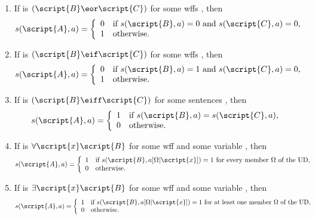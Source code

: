 \begin{enumerate}
\item If  is $(\script{B}\eor\script{C})$ for some wffs , then
\begin{displaymath}s(\script{A}, a) =
	\left\{\begin{array}{ll}
	0 & \mbox{if $s(\script{B}, a) = 0$  and $s(\script{C}, a) = 0$,}\\
	1 & \mbox{otherwise.}
	\end{array}\right.
\end{displaymath}

\item If  is $(\script{B}\eif\script{C})$ for some wffs , then
\begin{displaymath}s(\script{A}, a) =
	\left\{\begin{array}{ll}
	0 & \mbox{if $s(\script{B}, a) = 1$ and $s(\script{C}, a) = 0$,}\\
	1 & \mbox{otherwise.}
	\end{array}\right.
\end{displaymath}

\item If  is $(\script{B}\eiff\script{C})$ for some sentences , then
\begin{displaymath}s(\script{A}, a) =
	\left\{\begin{array}{ll}
	1 & \mbox{if $s(\script{B}, a) = s(\script{C}, a)$},\\
	0 & \mbox{otherwise.}
	\end{array}\right.
\end{displaymath}

\item If  is $\forall\script{x} \script{B}$ for some wff  and some variable , then
\begin{displaymath}s(\script{A}, a) =
	\left\{\begin{array}{ll}
	1 & \mbox{if $s(\script{B}, a[\Omega|\script{x}])=1$ for every member $\Omega$ of the UD},\\
	0 & \mbox{otherwise.}
	\end{array}\right.
\end{displaymath}

\item If  is $\exists\script{x} \script{B}$ for some wff  and some variable , then
\begin{displaymath}s(\script{A}, a) =
	\left\{\begin{array}{ll}
	1 & \mbox{if $s(\script{B}, a[\Omega|\script{x}])=1$ for at least one member $\Omega$ of the UD},\\
	0 & \mbox{otherwise.}
	\end{array}\right.
\end{displaymath}
\end{enumerate}
 
